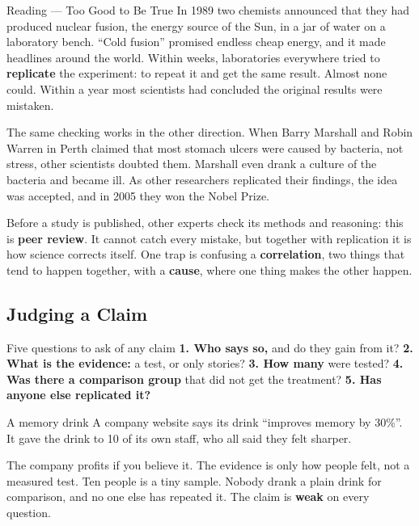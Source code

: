 \begin{readingbox}{Reading --- Too Good to Be True}
In 1989 two chemists announced that they had produced nuclear fusion, the energy source of the Sun, in a jar of water on a laboratory bench. ``Cold fusion'' promised endless cheap energy, and it made headlines around the world. Within weeks, laboratories everywhere tried to \textbf{replicate} the experiment: to repeat it and get the same result. Almost none could. Within a year most scientists had concluded the original results were mistaken.

The same checking works in the other direction. When Barry Marshall and Robin Warren in Perth claimed that most stomach ulcers were caused by bacteria, not stress, other scientists doubted them. Marshall even drank a culture of the bacteria and became ill. As other researchers replicated their findings, the idea was accepted, and in 2005 they won the Nobel Prize.

Before a study is published, other experts check its methods and reasoning: this is \textbf{peer review}. It cannot catch every mistake, but together with replication it is how science corrects itself. One trap is confusing a \textbf{correlation}, two things that tend to happen together, with a \textbf{cause}, where one thing makes the other happen.
\end{readingbox}

\rcreset
{}

\label{theory:1}

\subsection{Judging a Claim}\label{sub:a1.1}

\begin{skillbox}{Five questions to ask of any claim}
\textbf{1. Who says so,} and do they gain from it? \quad \textbf{2. What is the evidence:} a test, or only stories? \quad \textbf{3. How many} were tested? \quad \textbf{4. Was there a comparison group} that did not get the treatment? \quad \textbf{5. Has anyone else replicated it?}
\end{skillbox}

\begin{workedex}{A memory drink}
A company website says its drink ``improves memory by 30\%''. It gave the drink to 10 of its own staff, who all said they felt sharper.

\smallskip
The company profits if you believe it. The evidence is only how people felt, not a measured test. Ten people is a tiny sample. Nobody drank a plain drink for comparison, and no one else has repeated it. The claim is \textbf{weak} on every question.
\end{workedex}

